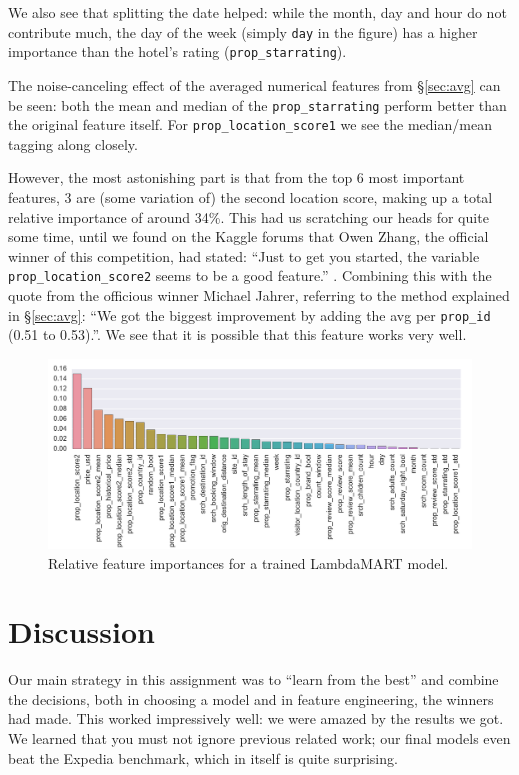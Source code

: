 \documentclass[runningheads,a4paper]{llncs}
\begin{document}
We also see that splitting the date helped: while the month, day and hour do not contribute much, the day of the week (simply \verb|day| in the figure) has a higher importance than the hotel's rating (\verb|prop_starrating|). 

The noise-canceling effect of the averaged numerical features from \S\ref{sec:avg} can be seen: both the mean and median of the \verb|prop_starrating| perform better than the original feature itself. For \verb|prop_location_score1| we see the median/mean tagging along closely.

However, the most astonishing part is that from the top 6 most important features, 3 are (some variation of) the second location score, making up a total relative importance of around 34\%. This had us scratching our heads for quite some time, until we found on the Kaggle forums that Owen Zhang, the official winner of this competition, had stated: ``Just to get you started, the variable \verb|prop_location_score2| seems to be a good feature.'' \cite[Topic 6177]{kaggle:forums}. Combining this with the quote from the officious winner Michael Jahrer, referring to the method explained in \S\ref{sec:avg}: ``We got the biggest improvement by adding the avg per \verb|prop_id| (0.51 to 0.53).\cite[Topic 6228]{kaggle:forums}''. We see that it is possible that this feature works very well.

\begin{figure}[h]
	\includegraphics[width=\linewidth]{Pictures/feature_importances.png}
    \caption{Relative feature importances for a trained LambdaMART model.}
    \label{fig:importances}
\end{figure}

\section{Discussion}
Our main strategy in this assignment was to ``learn from the best'' and combine the decisions, both in choosing a model and in feature engineering, the winners had made. This worked impressively well: we were amazed by the results we got. We learned that you must not ignore previous related work; our final models even beat the Expedia benchmark, which in itself is quite surprising.
\end{document}
